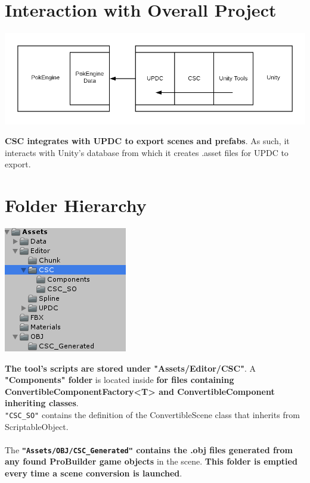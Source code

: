 \documentclass[12pt,a4paper]{article}
\begin{document}
\section{Interaction with Overall Project}
\begin{center}
\includegraphics[scale=0.5]{CSCLocation}
\end{center}
\textbf{CSC integrates with UPDC to export scenes and prefabs}. As such, it interacts with Unity's database from which it creates .asset files for UPDC to export.

\section{Folder Hierarchy}
\begin{center}
\includegraphics[scale=1.0]{folderStructureCSC}
\end{center}
\textbf{The tool's scripts are stored under "Assets/Editor/CSC"}. A \textbf{"Components" folder} is located inside \textbf{for files containing ConvertibleComponentFactory<T> and ConvertibleComponent inheriting classes}.\\
\texttt{"CSC\_SO"} contains the definition of the ConvertibleScene class that inherits from ScriptableObject.\\\\
The \textbf{\texttt{"Assets/OBJ/CSC\_Generated"} contains the .obj files generated from any found ProBuilder game objects} in the scene. \textbf{This folder is emptied every time a scene conversion is launched}.
\end{document}
